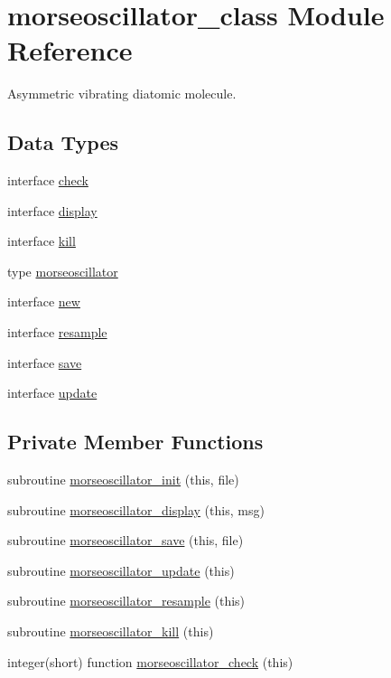 \hypertarget{classmorseoscillator__class}{\section{morseoscillator\+\_\+class Module Reference}
\label{classmorseoscillator__class}
}


Asymmetric vibrating diatomic molecule.  


\subsection*{Data Types}
\begin{DoxyCompactItemize}
\item 
interface \hyperlink{interfacemorseoscillator__class_1_1check}{check}
\item 
interface \hyperlink{interfacemorseoscillator__class_1_1display}{display}
\item 
interface \hyperlink{interfacemorseoscillator__class_1_1kill}{kill}
\item 
type \hyperlink{structmorseoscillator__class_1_1morseoscillator}{morseoscillator}
\item 
interface \hyperlink{interfacemorseoscillator__class_1_1new}{new}
\item 
interface \hyperlink{interfacemorseoscillator__class_1_1resample}{resample}
\item 
interface \hyperlink{interfacemorseoscillator__class_1_1save}{save}
\item 
interface \hyperlink{interfacemorseoscillator__class_1_1update}{update}
\end{DoxyCompactItemize}
\subsection*{Private Member Functions}
\begin{DoxyCompactItemize}
\item 
subroutine \hyperlink{classmorseoscillator__class_a3842a1d1f9377034ff1f6124857e51de}{morseoscillator\+\_\+init} (this, file)
\item 
subroutine \hyperlink{classmorseoscillator__class_a8440138baa841d30591c18f0e3e2f1bc}{morseoscillator\+\_\+display} (this, msg)
\item 
subroutine \hyperlink{classmorseoscillator__class_a3fc832120813151374e36812f197b6fb}{morseoscillator\+\_\+save} (this, file)
\item 
subroutine \hyperlink{classmorseoscillator__class_a7870a3ed799ccd9142982f1d7b96d3b8}{morseoscillator\+\_\+update} (this)
\item 
subroutine \hyperlink{classmorseoscillator__class_ac6d31db45305512ff58904656a5dac38}{morseoscillator\+\_\+resample} (this)
\item 
subroutine \hyperlink{classmorseoscillator__class_a358db5493845f66a305f8e88ff3bc56f}{morseoscillator\+\_\+kill} (this)
\item 
integer(short) function \hyperlink{classmorseoscillator__class_a3439cb5f66f4a5736d739c55426740bf}{morseoscillator\+\_\+check} (this)
\end{DoxyCompactItemize}



